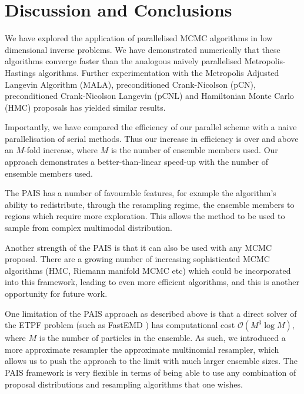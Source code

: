 \documentclass[final]{siamltex}
\begin{document}
\section{Discussion and Conclusions}\label{Sec:Conc} 

We have explored the application of parallelised MCMC algorithms in
low dimensional inverse problems. We have demonstrated numerically
that these algorithms converge faster than the analogous naively parallelised
Metropolis-Hastings algorithms. Further experimentation with the Metropolis
Adjusted Langevin Algorithm (MALA), preconditioned Crank-Nicolson (pCN),
preconditioned Crank-Nicolson Langevin (pCNL) and Hamiltonian
Monte Carlo (HMC) proposals has yielded similar results\cite{Paul}.

Importantly, we have compared the efficiency of our parallel scheme
with a naive parallelisation of serial methods. Thus our increase in
efficiency is over and above an $M$-fold increase, where $M$ is the
number of ensemble members used. Our approach
demonstrates a better-than-linear speed-up with the number of ensemble
members used. 

The PAIS has a number of favourable features, for example the
algorithm's ability to redistribute, through the resampling regime,
the ensemble members to regions which require more exploration. This allows the
method to be used to sample from complex multimodal distribution.

Another strength of the PAIS is that it can also be used with any MCMC
proposal. There are a growing number of increasing sophisticated MCMC
algorithms (HMC, Riemann manifold MCMC etc) which could be
incorporated into this framework, leading to even more efficient
algorithms, and this is another opportunity for future work. 

One limitation of the PAIS approach as described above is that a
direct solver of the ETPF problem (such as FastEMD \cite{FastEMD}) has computational cost
$\mathcal{O}(M^3\log M)$, where $M$ is the number of particles in the
ensemble. As such, we introduced a more approximate resampler the
approximate multinomial resampler, which allows us to push the
approach to the limit
with much larger ensemble sizes. The PAIS framework is very flexible
in terms of being able to use any combination of proposal
distributions and resampling algorithms that one wishes.



\end{document}
